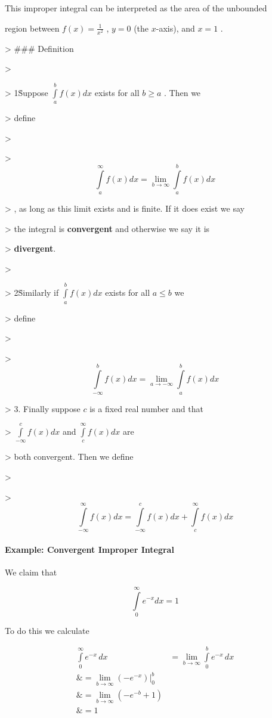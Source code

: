 This improper integral can be interpreted as the area of the unbounded

region between $f(x)=\frac{1}{x^2}$ , $y=0$ (the $x$-axis), and $x=1$ .



> ### Definition

>

> 1\. Suppose $\int\limits _a^b f(x)dx$ exists for all $b\ge a$ . Then we

> define

>

> $$\int\limits _a^\infty f(x)dx=\lim _{b\to\infty}\int\limits _a^b f(x)dx$$

> , as long as this limit exists and is finite. If it does exist we say

> the integral is \textbf{convergent} and otherwise we say it is

> \textbf{divergent}.

>

> 2\. Similarly if $\int\limits _a^b f(x)dx$ exists for all $a\le b$ we

> define

>

> $$\int\limits _{-\infty}^b f(x)dx=\lim _{a\to-\infty}\int\limits _a^b f(x)dx$$

> 3. Finally suppose $c$ is a fixed real number and that

> $\int\limits _{-\infty}^c f(x)dx$ and $\int\limits _c^\infty f(x)dx$ are

> both convergent. Then we define

>

> $$\int\limits _{-\infty}^\infty f(x)dx=\int\limits _{-\infty}^c f(x)dx+\int\limits _c^\infty f(x)dx$$



\paragraph{Example: Convergent Improper Integral}



We claim that



$$\int\limits _0^\infty e^{-x}dx=1$$



To do this we calculate



\begin{align}
\int\limits _0^\infty e^{-x}\,dx 

&= \lim _{b\to\infty}\int\limits _0^b e^{-x}\,dx \\\&= \lim _{b\to\infty}(-e^{-x})\Bigr| _0^b \\\&= \lim _{b\to\infty}\left(-e^{-b} + 1 \right) \\\&= 1
\end{align}





